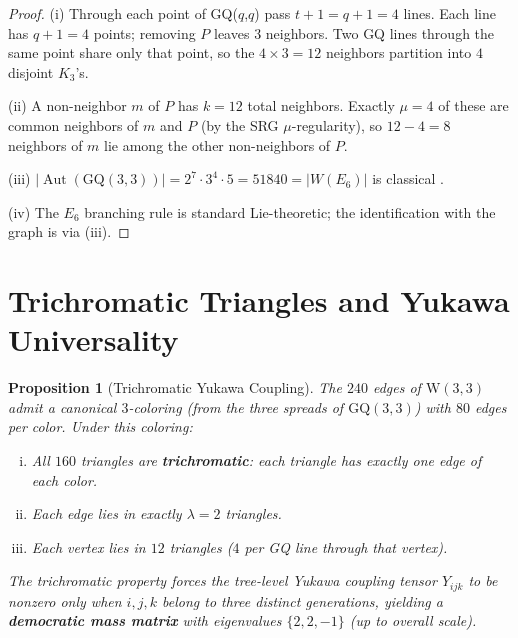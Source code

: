 \documentclass[12pt,a4paper]{article}
\newtheorem{proposition}[theorem]{Proposition}
\newcommand{\W}{\mathrm{W}(3,3)}
\begin{document}
\begin{proof}
(i) Through each point of GQ($q$,$q$) pass $t + 1 = q + 1 = 4$ lines.
Each line has $q + 1 = 4$ points; removing $P$ leaves $3$ neighbors.
Two GQ lines through the same point share only that point, so the
$4 \times 3 = 12$ neighbors partition into $4$ disjoint $K_3$'s.

(ii) A non-neighbor $m$ of $P$ has $k = 12$ total neighbors.
Exactly $\mu = 4$ of these are common neighbors of $m$ and $P$
(by the SRG $\mu$-regularity), so $12 - 4 = 8$ neighbors of $m$
lie among the other non-neighbors of $P$.

(iii) $|\operatorname{Aut}(\mathrm{GQ}(3,3))| = 2^7 \cdot 3^4 \cdot 5
= 51840 = |W(E_6)|$ is classical
\cite{Payne1984}.

(iv) The $E_6$ branching rule is standard Lie-theoretic;
the identification with the graph is via (iii).
\end{proof}

\section{Trichromatic Triangles and Yukawa Universality}
\label{sec:yukawa}

\begin{proposition}[Trichromatic Yukawa Coupling]\label{prop:yukawa}
The $240$ edges of\/ $\W$ admit a canonical $3$-coloring (from the
three spreads of\/ $\mathrm{GQ}(3,3)$) with $80$ edges per color.
Under this coloring:
\begin{enumerate}[(i)]
  \item All $160$ triangles are \textbf{trichromatic}: each triangle
        has exactly one edge of each color.
  \item Each edge lies in exactly $\lambda = 2$ triangles.
  \item Each vertex lies in $12$ triangles ($4$ per GQ line
        through that vertex).
\end{enumerate}
The trichromatic property forces the tree-level Yukawa coupling
tensor $Y_{ijk}$ to be nonzero only when $i,j,k$ belong to
three \emph{distinct} generations, yielding a \textbf{democratic
mass matrix} with eigenvalues $\{2,2,-1\}$ (up to overall scale).
\end{proposition}
\end{document}

